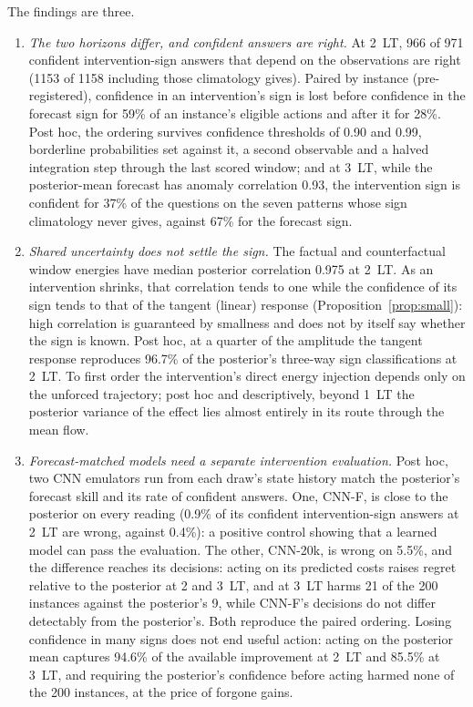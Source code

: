 \documentclass[11pt]{article}
\begin{document}
The findings are three.
\begin{enumerate}
\item \emph{The two horizons differ, and confident answers are right.} At 2~LT, 966 of 971 confident intervention-sign answers that depend on the observations are right (1153 of 1158 including those climatology gives). Paired by instance (pre-registered), confidence in an intervention's sign is lost before confidence in the forecast sign for 59\% of an instance's eligible actions and after it for 28\%. Post hoc, the ordering survives confidence thresholds of 0.90 and 0.99, borderline probabilities set against it, a second observable and a halved integration step through the last scored window; and at 3~LT, while the posterior-mean forecast has anomaly correlation 0.93, the intervention sign is confident for 37\% of the questions on the seven patterns whose sign climatology never gives, against 67\% for the forecast sign.
\item \emph{Shared uncertainty does not settle the sign.} The factual and counterfactual window energies have median posterior correlation 0.975 at 2~LT. As an intervention shrinks, that correlation tends to one while the confidence of its sign tends to that of the tangent (linear) response (Proposition~\ref{prop:small}): high correlation is guaranteed by smallness and does not by itself say whether the sign is known. Post hoc, at a quarter of the amplitude the tangent response reproduces 96.7\% of the posterior's three-way sign classifications at 2~LT. To first order the intervention's direct energy injection depends only on the unforced trajectory; post hoc and descriptively, beyond 1~LT the posterior variance of the effect lies almost entirely in its route through the mean flow.
\item \emph{Forecast-matched models need a separate intervention evaluation.} Post hoc, two CNN emulators run from each draw's state history match the posterior's forecast skill and its rate of confident answers. One, CNN-F, is close to the posterior on every reading (0.9\% of its confident intervention-sign answers at 2~LT are wrong, against 0.4\%): a positive control showing that a learned model can pass the evaluation. The other, CNN-20k, is wrong on 5.5\%, and the difference reaches its decisions: acting on its predicted costs raises regret relative to the posterior at 2 and 3~LT, and at 3~LT harms 21 of the 200 instances against the posterior's 9, while CNN-F's decisions do not differ detectably from the posterior's. Both reproduce the paired ordering. Losing confidence in many signs does not end useful action: acting on the posterior mean captures 94.6\% of the available improvement at 2~LT and 85.5\% at 3~LT, and requiring the posterior's confidence before acting harmed none of the 200 instances, at the price of forgone gains.
\end{enumerate}
\end{document}

